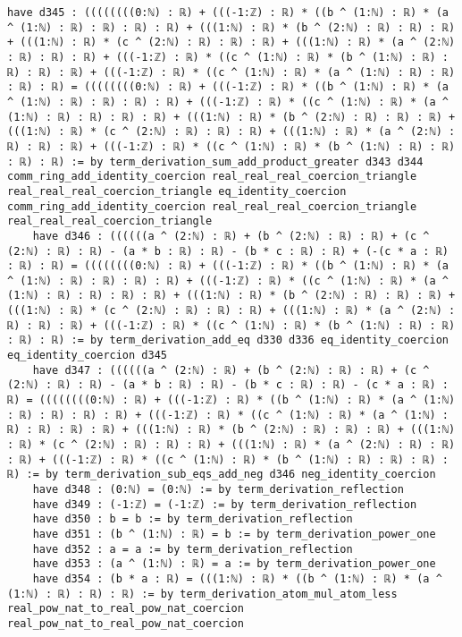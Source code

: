 \documentclass{article}
\begin{document}
\begin{tcolorbox}[colback=white!10, width=\linewidth]
\begin{lstlisting}[language=Lean4]
    have d345 : ((((((((0:ℕ) : ℝ) + (((-1:ℤ) : ℝ) * ((b ^ (1:ℕ) : ℝ) * (a ^ (1:ℕ) : ℝ) : ℝ) : ℝ) : ℝ) + (((1:ℕ) : ℝ) * (b ^ (2:ℕ) : ℝ) : ℝ) : ℝ) + (((1:ℕ) : ℝ) * (c ^ (2:ℕ) : ℝ) : ℝ) : ℝ) + (((1:ℕ) : ℝ) * (a ^ (2:ℕ) : ℝ) : ℝ) : ℝ) + (((-1:ℤ) : ℝ) * ((c ^ (1:ℕ) : ℝ) * (b ^ (1:ℕ) : ℝ) : ℝ) : ℝ) : ℝ) + (((-1:ℤ) : ℝ) * ((c ^ (1:ℕ) : ℝ) * (a ^ (1:ℕ) : ℝ) : ℝ) : ℝ) : ℝ) = ((((((((0:ℕ) : ℝ) + (((-1:ℤ) : ℝ) * ((b ^ (1:ℕ) : ℝ) * (a ^ (1:ℕ) : ℝ) : ℝ) : ℝ) : ℝ) + (((-1:ℤ) : ℝ) * ((c ^ (1:ℕ) : ℝ) * (a ^ (1:ℕ) : ℝ) : ℝ) : ℝ) : ℝ) + (((1:ℕ) : ℝ) * (b ^ (2:ℕ) : ℝ) : ℝ) : ℝ) + (((1:ℕ) : ℝ) * (c ^ (2:ℕ) : ℝ) : ℝ) : ℝ) + (((1:ℕ) : ℝ) * (a ^ (2:ℕ) : ℝ) : ℝ) : ℝ) + (((-1:ℤ) : ℝ) * ((c ^ (1:ℕ) : ℝ) * (b ^ (1:ℕ) : ℝ) : ℝ) : ℝ) : ℝ) := by term_derivation_sum_add_product_greater d343 d344 comm_ring_add_identity_coercion real_real_real_coercion_triangle real_real_real_coercion_triangle eq_identity_coercion comm_ring_add_identity_coercion real_real_real_coercion_triangle real_real_real_coercion_triangle
    have d346 : ((((((a ^ (2:ℕ) : ℝ) + (b ^ (2:ℕ) : ℝ) : ℝ) + (c ^ (2:ℕ) : ℝ) : ℝ) - (a * b : ℝ) : ℝ) - (b * c : ℝ) : ℝ) + (-(c * a : ℝ) : ℝ) : ℝ) = ((((((((0:ℕ) : ℝ) + (((-1:ℤ) : ℝ) * ((b ^ (1:ℕ) : ℝ) * (a ^ (1:ℕ) : ℝ) : ℝ) : ℝ) : ℝ) + (((-1:ℤ) : ℝ) * ((c ^ (1:ℕ) : ℝ) * (a ^ (1:ℕ) : ℝ) : ℝ) : ℝ) : ℝ) + (((1:ℕ) : ℝ) * (b ^ (2:ℕ) : ℝ) : ℝ) : ℝ) + (((1:ℕ) : ℝ) * (c ^ (2:ℕ) : ℝ) : ℝ) : ℝ) + (((1:ℕ) : ℝ) * (a ^ (2:ℕ) : ℝ) : ℝ) : ℝ) + (((-1:ℤ) : ℝ) * ((c ^ (1:ℕ) : ℝ) * (b ^ (1:ℕ) : ℝ) : ℝ) : ℝ) : ℝ) := by term_derivation_add_eq d330 d336 eq_identity_coercion eq_identity_coercion d345
    have d347 : ((((((a ^ (2:ℕ) : ℝ) + (b ^ (2:ℕ) : ℝ) : ℝ) + (c ^ (2:ℕ) : ℝ) : ℝ) - (a * b : ℝ) : ℝ) - (b * c : ℝ) : ℝ) - (c * a : ℝ) : ℝ) = ((((((((0:ℕ) : ℝ) + (((-1:ℤ) : ℝ) * ((b ^ (1:ℕ) : ℝ) * (a ^ (1:ℕ) : ℝ) : ℝ) : ℝ) : ℝ) + (((-1:ℤ) : ℝ) * ((c ^ (1:ℕ) : ℝ) * (a ^ (1:ℕ) : ℝ) : ℝ) : ℝ) : ℝ) + (((1:ℕ) : ℝ) * (b ^ (2:ℕ) : ℝ) : ℝ) : ℝ) + (((1:ℕ) : ℝ) * (c ^ (2:ℕ) : ℝ) : ℝ) : ℝ) + (((1:ℕ) : ℝ) * (a ^ (2:ℕ) : ℝ) : ℝ) : ℝ) + (((-1:ℤ) : ℝ) * ((c ^ (1:ℕ) : ℝ) * (b ^ (1:ℕ) : ℝ) : ℝ) : ℝ) : ℝ) := by term_derivation_sub_eqs_add_neg d346 neg_identity_coercion
    have d348 : (0:ℕ) = (0:ℕ) := by term_derivation_reflection
    have d349 : (-1:ℤ) = (-1:ℤ) := by term_derivation_reflection
    have d350 : b = b := by term_derivation_reflection
    have d351 : (b ^ (1:ℕ) : ℝ) = b := by term_derivation_power_one
    have d352 : a = a := by term_derivation_reflection
    have d353 : (a ^ (1:ℕ) : ℝ) = a := by term_derivation_power_one
    have d354 : (b * a : ℝ) = (((1:ℕ) : ℝ) * ((b ^ (1:ℕ) : ℝ) * (a ^ (1:ℕ) : ℝ) : ℝ) : ℝ) := by term_derivation_atom_mul_atom_less real_pow_nat_to_real_pow_nat_coercion real_pow_nat_to_real_pow_nat_coercion

\end{lstlisting}
\end{tcolorbox}
\end{document}

